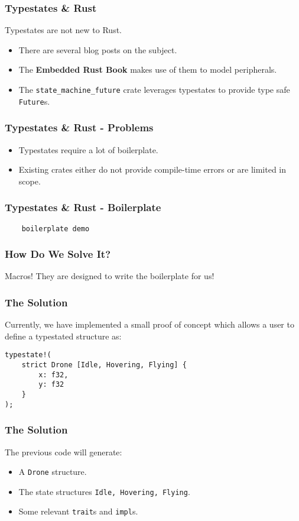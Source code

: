 \documentclass{beamer}
\begin{document}
\begin{frame}
    \frametitle{Typestates \& Rust}

    Typestates are not new to Rust.
    \begin{itemize}
        \item There are several blog posts on the subject.
        \item The \textbf{Embedded Rust Book} makes use of them to model peripherals.
        \item The \texttt{state\_machine\_future} crate leverages typestates to provide type safe \texttt{Future}s.
    \end{itemize}
\end{frame}

\begin{frame}
    \frametitle{Typestates \& Rust - Problems}

    \begin{itemize}
        \item Typestates require a lot of boilerplate.
        \item Existing crates either do not provide compile-time errors or are limited in scope.
    \end{itemize}
\end{frame}

\begin{frame}[fragile]
    \frametitle{Typestates \& Rust - Boilerplate}

    \begin{lstlisting}
    boilerplate demo
    \end{lstlisting}
\end{frame}

\begin{frame}[fragile]
    \frametitle{How Do We Solve It?}
    Macros! They are designed to write the boilerplate for us!
\end{frame}

\begin{frame}[fragile]
    \frametitle{The Solution}
    Currently, we have implemented a small proof of concept which allows a user to define a typestated structure as:
    \begin{lstlisting}
typestate!(
    strict Drone [Idle, Hovering, Flying] {
        x: f32,
        y: f32
    }
);
    \end{lstlisting}
\end{frame}

\begin{frame}[fragile]
    \frametitle{The Solution}
    The previous code will generate:
    \begin{itemize}
        \item A \texttt{Drone} structure.
        \item The state structures \texttt{Idle, Hovering, Flying}.
        \item Some relevant \texttt{trait}s and \texttt{impl}s.
    \end{itemize}
\end{frame}
\end{document}
